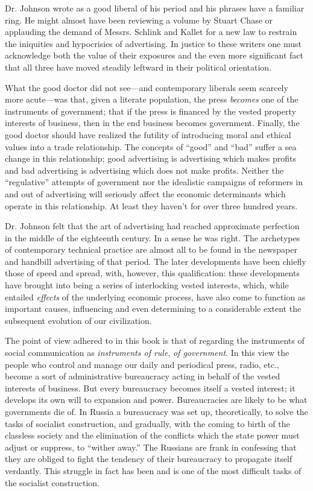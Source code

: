 \documentclass[openany,nobib]{tufte-book}
\begin{document}
Dr. Johnson wrote as a good liberal of his period and his phrases have a
familiar ring. He might almost have been reviewing a volume by Stuart
Chase or applauding the demand of Messrs. Schlink and Kallet for a new
law to restrain the iniquities and hypocrisies of advertising. In
justice to these writers one must acknowledge both the value of their
exposures and the even more significant fact that all three have moved
steadily leftward in their political orientation.

What the good doctor did not see---and contemporary liberals seem
scarcely more acute---was that, given a literate population, the press
\emph{becomes} one of the instruments of government; that if the press
is financed by the vested property interests of business, then in the
end business becomes government. Finally, the good doctor should have
realized the futility of introducing moral and ethical values into a
trade relationship. The concepts of ``good'' and ``bad'' suffer a sea
change in this relationship; good advertising is advertising which makes
profits and bad advertising is advertising which does not make profits.
Neither the ``regulative'' attempts of government nor the idealistic
campaigns of reformers in and out of advertising will seriously affect
the economic determinants which operate in this relationship. At least
they haven't for over three hundred years.

Dr. Johnson felt that the art of advertising had reached approximate
perfection in the middle of the eighteenth century. In a sense he was
right. The archetypes of contemporary technical practice are almost all
to be found in the newspaper and handbill advertising of that period.
The later developments have been chiefly those of speed and spread,
with, however, this qualification: these developments have brought into
being a series of interlocking vested interests, which, while entailed
\emph{effects} of the underlying economic process, have also come to
function as important causes, influencing and even determining to a
considerable extent the subsequent evolution of our civilization.

The point of view adhered to in this book is that of regarding the
instruments of social communication as \emph{instruments of rule},
\emph{of government}. In this view the people who control and manage our
daily and periodical press, radio, etc., become a sort of administrative
bureaucracy acting in behalf of the vested interests of business. But
every bureaucracy becomes itself a vested interest; it develops its own
will to expansion and power. Bureaucracies are likely to be what
governments die of. In Russia a bureaucracy was set up, theoretically,
to solve the tasks of socialist construction, and gradually, with the
coming to birth of the classless society and the elimination of the
conflicts which the state power must adjust or suppress, to ``wither
away.'' The Russians are frank in confessing that they are obliged to
fight the tendency of their bureaucracy to propagate itself verdantly.
This struggle in fact has been and is one of the most difficult tasks of
the socialist construction.
\end{document}
